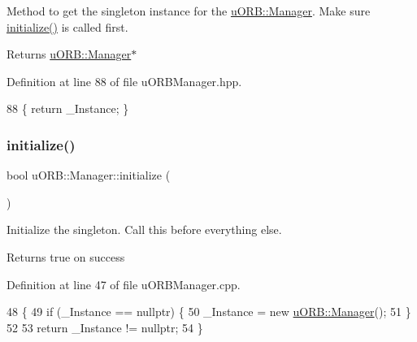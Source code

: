Method to get the singleton instance for the \hyperlink{classuORB_1_1Manager}{u\+O\+R\+B\+::\+Manager}. Make sure \hyperlink{classuORB_1_1Manager_abb160fdd7ba0fe448ffa7f654a796267}{initialize()} is called first. \begin{DoxyReturn}{Returns}
\hyperlink{classuORB_1_1Manager}{u\+O\+R\+B\+::\+Manager}$\ast$ 
\end{DoxyReturn}


Definition at line 88 of file u\+O\+R\+B\+Manager.\+hpp.


\begin{DoxyCode}
88 \{ \textcolor{keywordflow}{return} \_Instance; \}
\end{DoxyCode}
\mbox{\label{classuORB_1_1Manager_abb160fdd7ba0fe448ffa7f654a796267}} 
\subsubsection{\texorpdfstring{initialize()}{initialize()}}
{\footnotesize\ttfamily bool u\+O\+R\+B\+::\+Manager\+::initialize (\begin{DoxyParamCaption}{ }\end{DoxyParamCaption})\hspace{0.3cm}{\ttfamily [static]}}

Initialize the singleton. Call this before everything else. \begin{DoxyReturn}{Returns}
true on success 
\end{DoxyReturn}


Definition at line 47 of file u\+O\+R\+B\+Manager.\+cpp.


\begin{DoxyCode}
48 \{
49     \textcolor{keywordflow}{if} (\_Instance == \textcolor{keyword}{nullptr}) \{
50         \_Instance = \textcolor{keyword}{new} \hyperlink{classuORB_1_1Manager}{uORB::Manager}();
51     \}
52 
53     \textcolor{keywordflow}{return} \_Instance != \textcolor{keyword}{nullptr};
54 \}
\end{DoxyCode}
\mbox{\label{classuORB_1_1Manager_a42e075fba5970aa0730faab182e2083f}} 
